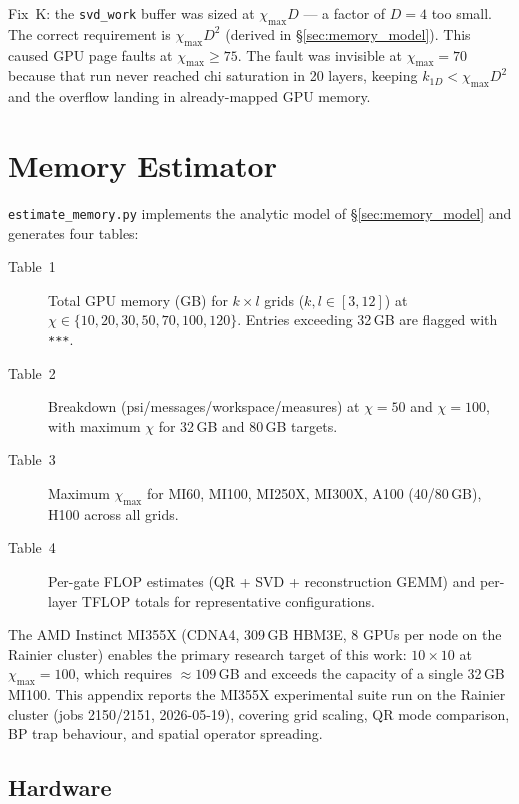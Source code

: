 \documentclass[11pt]{article}
\newcommand{\chimax}{\chi_{\mathrm{max}}}
\begin{document}
Fix~K: the \texttt{svd\_work} buffer was sized at $\chimax D$ — a factor of $D=4$
too small. The correct requirement is $\chimax D^2$ (derived in
\S\ref{sec:memory_model}). This caused GPU page faults at $\chimax \geq 75$.
The fault was invisible at $\chimax=70$ because that run never reached chi
saturation in 20 layers, keeping $k_{1D} < \chimax D^2$ and the overflow landing
in already-mapped GPU memory.

\section{Memory Estimator}
\label{app:estimator}

\texttt{estimate\_memory.py} implements the analytic model of
\S\ref{sec:memory_model} and generates four tables:

\begin{description}
  \item[Table~1] Total GPU memory (GB) for $k\times l$ grids
    ($k,l \in [3,12]$) at $\chi \in \{10,20,30,50,70,100,120\}$.
    Entries exceeding 32\,GB are flagged with \texttt{***}.
  \item[Table~2] Breakdown (psi/messages/workspace/measures)
    at $\chi=50$ and $\chi=100$, with maximum $\chi$ for 32\,GB and 80\,GB targets.
  \item[Table~3] Maximum $\chimax$ for MI60, MI100, MI250X, MI300X,
    A100 (40/80\,GB), H100 across all grids.
  \item[Table~4] Per-gate FLOP estimates (QR + SVD + reconstruction GEMM)
    and per-layer TFLOP totals for representative configurations.
\end{description}




\iffalse
The AMD Instinct MI355X (CDNA4, 309\,GB HBM3E, 8 GPUs per node on the Rainier
cluster) enables the primary research target of this work: $10\times10$ at
$\chimax=100$, which requires $\approx 109$\,GB and exceeds the capacity of a
single 32\,GB MI100.
This appendix reports the MI355X experimental suite run on the Rainier cluster
(jobs 2150/2151, 2026-05-19), covering grid scaling, QR mode comparison, BP
trap behaviour, and spatial operator spreading.

\subsection*{Hardware}
\end{document}

